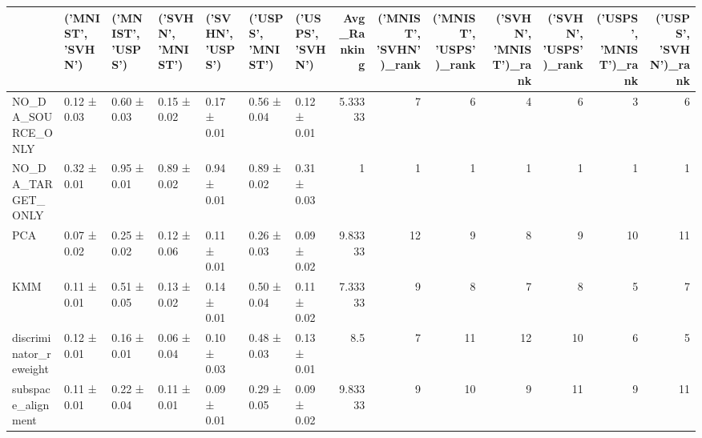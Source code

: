 \begin{tabular}{lllllllrrrrrrr}
\hline
                              & ('MNIST', 'SVHN')   & ('MNIST', 'USPS')   & ('SVHN', 'MNIST')   & ('SVHN', 'USPS')   & ('USPS', 'MNIST')   & ('USPS', 'SVHN')   &   Avg\_Ranking &   ('MNIST', 'SVHN')\_rank &   ('MNIST', 'USPS')\_rank &   ('SVHN', 'MNIST')\_rank &   ('SVHN', 'USPS')\_rank &   ('USPS', 'MNIST')\_rank &   ('USPS', 'SVHN')\_rank \\
\hline
 NO\_DA\_SOURCE\_ONLY            & 0.12 ± 0.03         & 0.60 ± 0.03         & 0.15 ± 0.02         & 0.17 ± 0.01        & 0.56 ± 0.04         & 0.12 ± 0.01        &       5.33333 &                        7 &                        6 &                        4 &                       6 &                        3 &                       6 \\
 NO\_DA\_TARGET\_ONLY            & 0.32 ± 0.01         & 0.95 ± 0.01         & 0.89 ± 0.02         & 0.94 ± 0.01        & 0.89 ± 0.02         & 0.31 ± 0.03        &       1       &                        1 &                        1 &                        1 &                       1 &                        1 &                       1 \\
 PCA                          & 0.07 ± 0.02         & 0.25 ± 0.02         & 0.12 ± 0.06         & 0.11 ± 0.01        & 0.26 ± 0.03         & 0.09 ± 0.02        &       9.83333 &                       12 &                        9 &                        8 &                       9 &                       10 &                      11 \\
 KMM                          & 0.11 ± 0.01         & 0.51 ± 0.05         & 0.13 ± 0.02         & 0.14 ± 0.01        & 0.50 ± 0.04         & 0.11 ± 0.02        &       7.33333 &                        9 &                        8 &                        7 &                       8 &                        5 &                       7 \\
 discriminator\_reweight       & 0.12 ± 0.01         & 0.16 ± 0.01         & 0.06 ± 0.04         & 0.10 ± 0.03        & 0.48 ± 0.03         & 0.13 ± 0.01        &       8.5     &                        7 &                       11 &                       12 &                      10 &                        6 &                       5 \\
 subspace\_alignment           & 0.11 ± 0.01         & 0.22 ± 0.04         & 0.11 ± 0.01         & 0.09 ± 0.01        & 0.29 ± 0.05         & 0.09 ± 0.02        &       9.83333 &                        9 &                       10 &                        9 &                      11 &                        9 &                      11 \\

\end{tabular}
